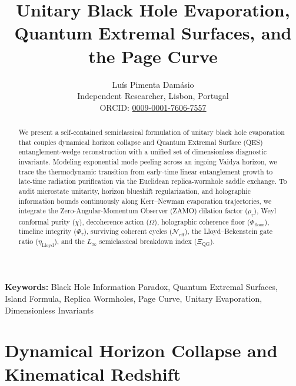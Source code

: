 \documentclass[11pt,a4paper]{article}
\title{\textbf{Unitary Black Hole Evaporation, Quantum Extremal Surfaces, and the Page Curve}}
\author{Lu\'is {Pimenta Dam\'asio}\\
\small Independent Researcher, Lisbon, Portugal\\
\small ORCID: \href{https://orcid.org/0009-0001-7606-7557}{0009-0001-7606-7557}}
\date{}
\begin{document}
\maketitle

\begin{abstract}
We present a self-contained semiclassical formulation of unitary black hole evaporation that couples dynamical horizon collapse and Quantum Extremal Surface (QES) entanglement-wedge reconstruction with a unified set of dimensionless diagnostic invariants. Modeling exponential mode peeling across an ingoing Vaidya horizon, we trace the thermodynamic transition from early-time linear entanglement growth to late-time radiation purification via the Euclidean replica-wormhole saddle exchange. To audit microstate unitarity, horizon blueshift regularization, and holographic information bounds continuously along Kerr--Newman evaporation trajectories, we integrate the Zero-Angular-Momentum Observer (ZAMO) dilation factor ($\rho_\tau$), Weyl conformal purity ($\chi$), decoherence action ($\Omega$), holographic coherence floor ($\Phi_{\text{floor}}$), timeline integrity ($\Phi_\tau$), surviving coherent cycles ($\mathcal{N}_{\text{eff}}$), the Lloyd--Bekenstein gate ratio ($\eta_{\text{Lloyd}}$), and the $L_\infty$ semiclassical breakdown index ($\Xi_{\text{QG}}$).
\end{abstract}

\noindent\textbf{Keywords:} Black Hole Information Paradox, Quantum Extremal Surfaces, Island Formula, Replica Wormholes, Page Curve, Unitary Evaporation, Dimensionless Invariants

\vspace{0.8em}
\noindent{}
\vspace{1em}

\section{Dynamical Horizon Collapse and Kinematical Redshift}
\end{document}
